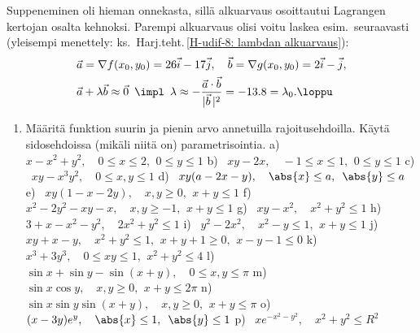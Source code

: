 Suppeneminen oli hieman onnekasta, sillä alkuarvaus osoittautui Lagrangen kertojan osalta
kehnoksi. Parempi alkuarvaus olisi voitu laskea esim.\ seuraavasti (yleisempi menettely: ks.\
Harj.teht.\,\ref{H-udif-8: lambdan alkuarvaus}):
\begin{align*}
&\vec a=\nabla f(x_0,y_0)=26\vec i-17\vec j, \quad \vec b=\nabla g(x_0,y_0)=2\vec i-\vec j, \\
&\vec a+\lambda\vec b \approx \vec 0\,\ \impl\,\ 
\lambda \approx -\frac{\vec a\cdot\vec b}{|\vec b\,|^2} = -13.8 = \lambda_0. \loppu
\end{align*}

\Harj
\begin{enumerate}

\item
Määritä funktion suurin ja pienin arvo annetuilla rajoitusehdoilla. Käytä
sidosehdoissa (mikäli niitä on) parametrisointia. \vspace{1mm}\newline
a) \ $x-x^2+y^2, \quad 0 \le x \le 2,\,\ 0 \le y \le 1$ \newline
b) \ $xy-2x, \quad -1 \le x \le 1,\,\ 0 \le y \le 1$ \newline
c) \ $xy-x^3y^2, \quad 0 \le x,y \le 1$ \newline
d) \ $xy(a-2x-y), \quad \abs{x} \le a,\,\ \abs{y} \le a$ \newline
e) \ $xy(1-x-2y), \quad x,y \ge 0,\,\ x+y \le 1$ \newline 
f) \ $x^2-2y^2-xy-x, \quad x,y \ge -1,\,\ x+y \le 1$ \newline
g) \ $xy-x^2, \quad x^2+y^2 \le 1$ \newline
h) \ $3+x-x^2-y^2, \quad 2x^2+y^2 \le 1$ \newline
i) \ $y^2-2x^2, \quad x^2-y \le 1,\,\ x+y \le 1$ \newline 
j) \ $xy+x-y, \quad x^2+y^2 \le 1,\,\ x+y+1 \ge 0,\,\ x-y-1 \le 0$ \newline
k) \ $x^3+3y^3, \quad 0 \le xy \le 1,\,\ x^2+y^2 \le 4$ \newline
l) \ $\sin x+\sin y-\sin(x+y), \quad 0 \le x,y \le \pi$ \newline
m) \ $\sin x\cos y, \quad x,y \ge 0,\,\ x+y \le 2\pi$ \newline
n) \ $\sin x\sin y\sin(x+y), \quad x,y \ge 0,\,\ x+y \le \pi$ \newline
o) \ $(x-3y)e^y, \quad \abs{x} \le 1,\,\ \abs{y} \le 1$ \newline
p) \ $xe^{-x^2-y^2}, \quad x^2+y^2 \le R^2$ \newline

\end{enumerate}
